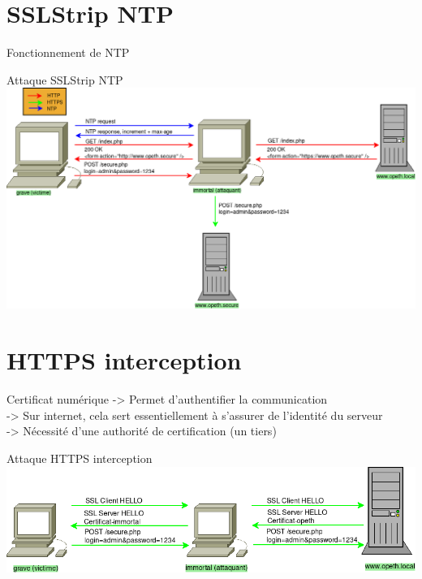 \documentclass{bredelebeamer}
\begin{document}
\section{SSLStrip NTP}

\begin{frame}{Fonctionnement de NTP}
\end{frame}

\begin{frame}{Attaque SSLStrip NTP}
    \includegraphics[width=\linewidth]{../medias/sslstrip-ntp/attack.png}
\end{frame}

\section{HTTPS interception}

\begin{frame}{Certificat numérique}
    -> Permet d'authentifier la communication \\
    -> Sur internet, cela sert essentiellement à s'assurer de l'identité du serveur \\
    -> Nécessité d'une authorité de certification (un tiers) \\
\end{frame}

\begin{frame}{Attaque HTTPS interception}
    \includegraphics[width=\linewidth]{../medias/https-interception/attack.png}
\end{frame}
\end{document}
